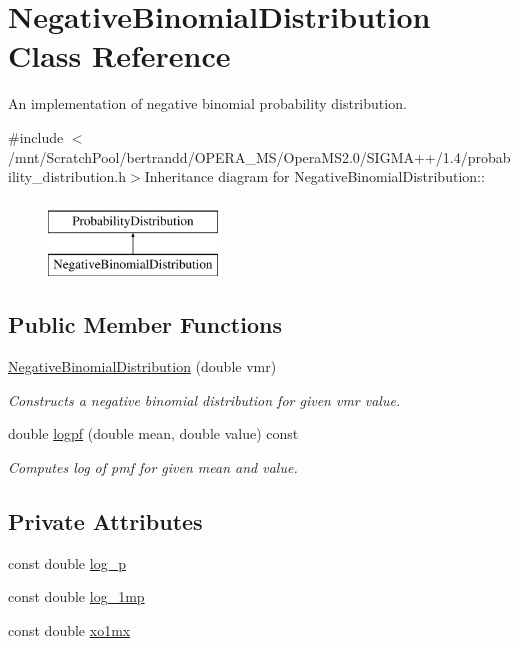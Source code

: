 \hypertarget{classNegativeBinomialDistribution}{
\section{NegativeBinomialDistribution Class Reference}
\label{classNegativeBinomialDistribution}
}


An implementation of negative binomial probability distribution.  


{\ttfamily \#include $<$/mnt/ScratchPool/bertrandd/OPERA\_\-MS/OperaMS2.0/SIGMA++/1.4/probability\_\-distribution.h$>$}Inheritance diagram for NegativeBinomialDistribution::\begin{figure}[H]
\begin{center}
\leavevmode
\includegraphics[height=2cm]{classNegativeBinomialDistribution}
\end{center}
\end{figure}
\subsection*{Public Member Functions}
\begin{DoxyCompactItemize}
\item 
\hyperlink{classNegativeBinomialDistribution_a2308881b292a5e00caa3549c546a8003}{NegativeBinomialDistribution} (double vmr)
\begin{DoxyCompactList}\small\item\em Constructs a negative binomial distribution for given vmr value. \item\end{DoxyCompactList}\item 
double \hyperlink{classNegativeBinomialDistribution_ad609aa4b6b7b3270e5e73a45a49ceb74}{logpf} (double mean, double value) const 
\begin{DoxyCompactList}\small\item\em Computes log of pmf for given mean and value. \item\end{DoxyCompactList}\end{DoxyCompactItemize}
\subsection*{Private Attributes}
\begin{DoxyCompactItemize}
\item 
const double \hyperlink{classNegativeBinomialDistribution_ad36a45d72380ad6d3ae6bebc01698299}{log\_\-p}
\item 
const double \hyperlink{classNegativeBinomialDistribution_a0a58d5dd1b3c0013e29c9c133d5823ca}{log\_\-1mp}
\item 
const double \hyperlink{classNegativeBinomialDistribution_a822012e6f1c7081e07d3951da182c7e4}{xo1mx}
\end{DoxyCompactItemize}


